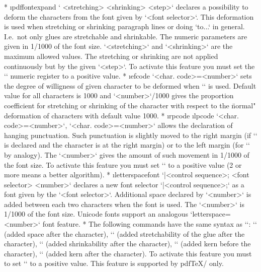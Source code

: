 {\begitems
* \i pdffontexpand 
  ` <stretching> <shrinking> <step>`
  declares a possibility to deform the characters from the font given by
  `<font selector>`. This deformation is used when stretching or shrinking
  paragraph lines or doing `\hbox to{...}` in general. I.e.\ not only glues are
  stretchable and shrinkable. The numeric parameters are given in 1/1000
  of the font size. `<stretching>` and `<shrinking>` are the maximum allowed
  values. The stretching or shrinking are not applied continuously but by
  the given `<step>`.
  To activate this feature you must set the \x`\pdfadjustspacing`
  numeric register to a positive value. 
* \i efcode `<char. code>=<number>`
  sets the degree of willigness of given character to be deformed when
  `\pdffontexpand` is used. Default value for all
  characters is 1000 and `<number>`/1000 gives the proportion coefficient for
  stretching or shrinking of the character with respect to the \"normal" deformation
  of characters with default value 1000.
* \i rpcode \i lpcode 
  `<char. code>=<number>`,
  `<char. code>=<number>` allows the declaration of
  hanging punctuation. Such punctuation is slightly moved to the right
  margin (if `\rpcode` is declared and the character is at the right margin) 
  or to the left margin (for `\lpcode` by analogy).
  The `<number>` gives the amount of such movement in 1/1000 of the font size.
  To activate this feature you must set \x`\pdfprotrudechars` to
  a positive value (2 or more means a better algorithm).
* \i letterspacefont
  ` |<control sequence>; <font selector> <number>`
  declares a new font selector `|<control sequence>;` as a font given by
  the `<font selector>`. Additional space declared by `<number>` is added
  between each two characters when the font is used. The `<number>` is 1/1000 of
  the font size. Unicode fonts support an analogous
  `letterspace=<number>` font feature. 
* The following commands have the same syntax as `\rpcode`:
  \x`\knbscode` (added space after the character),
  \x`\stbscode` (added stretchability of the glue after the character),
  \x`\shbscode` (added shrinkability after the character),
  \x`\knbccode` (added kern before the character),
  \x`\knaccode` (added kern after the character).
  To activate this feature you must to set
  \x`\pdfadjustinterwordglue` to a positive value.
  This feature is supported by pdf\TeX/ only.
\enditems


}
